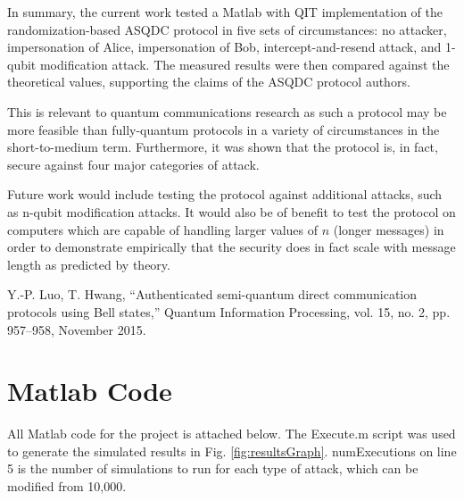 \documentclass[conference]{IEEEtran}
\begin{document}
In summary, the current work tested a Matlab with QIT implementation
of the randomization-based ASQDC protocol in five sets of circumstances:
no attacker, impersonation of Alice, impersonation of Bob, intercept-and-resend
attack, and 1-qubit modification attack. The measured results were
then compared against the theoretical values, supporting the claims
of the ASQDC protocol authors.

This is relevant to quantum communications research as such a protocol
may be more feasible than fully-quantum protocols in a variety of
circumstances in the short-to-medium term. Furthermore, it was shown
that the protocol is, in fact, secure against four major categories
of attack.

Future work would include testing the protocol against additional
attacks, such as n-qubit modification attacks. It would also be of
benefit to test the protocol on computers which are capable of handling
larger values of $n$ (longer messages) in order to demonstrate empirically
that the security does in fact scale with message length as predicted
by theory.

\begin{thebibliography}{00}
 Y.-P. Luo, T. Hwang, ``Authenticated semi-quantum direct communication protocols using Bell states,'' Quantum Information Processing, vol. 15, no. 2, pp. 957--958, November 2015.
\end{thebibliography}
\vspace{12pt}

\appendix
\section{Matlab Code}
All Matlab code for the project is attached below. The {\ttfamily Execute.m} script was used to generate the simulated results in Fig. \ref{fig:resultsGraph}.
{\ttfamily numExecutions} on line 5 is the number of simulations to run for each type of attack, which can be modified from 10,000.

\onecolumn
{}






\end{document}

